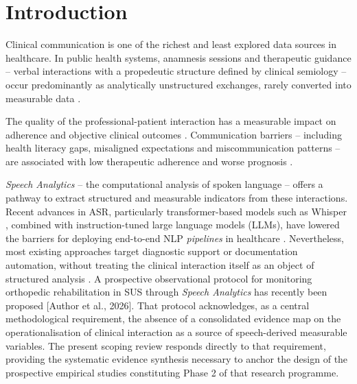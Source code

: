 \documentclass[review,12pt]{elsarticle}
\begin{document}
\section{Introduction}
\label{sec:intro}

Clinical communication is one of the richest and least explored data sources
in healthcare. In public health systems, anamnesis sessions and therapeutic
guidance -- verbal interactions with a propedeutic structure defined
by clinical semiology \citep{Porto2019} -- occur predominantly
as analytically unstructured exchanges, rarely converted into measurable
data \citep{Wang2018,Koleck2019}.

The quality of the professional-patient interaction has a measurable impact
on adherence and objective clinical outcomes \citep{Kelley2014}. Communication
barriers -- including health literacy gaps, misaligned expectations and
miscommunication patterns -- are associated with low therapeutic adherence
and worse prognosis \citep{McCabe2018,Alkhamees2023}.

\textit{Speech Analytics} -- the computational analysis of spoken language --
offers a pathway to extract structured and measurable indicators from these
interactions. Recent advances in ASR, particularly transformer-based models
such as Whisper \citep{Radford2023}, combined with instruction-tuned large
language models (LLMs), have lowered the barriers for deploying end-to-end
NLP \textit{pipelines} in healthcare \citep{Klusty2025}. Nevertheless, most
existing approaches target diagnostic support or documentation automation,
without treating the clinical interaction itself as an object of structured
analysis \citep{vanBuchem2021}. A prospective observational protocol for
monitoring orthopedic rehabilitation in SUS through \textit{Speech
Analytics} has recently been proposed [Author et al., 2026]. That protocol
acknowledges, as a central methodological requirement, the absence of a
consolidated evidence map on the operationalisation of clinical interaction
as a source of speech-derived measurable variables. The present scoping
review responds directly to that requirement, providing the systematic
evidence synthesis necessary to anchor the design of the prospective
empirical studies constituting Phase 2 of that research programme.
\end{document}
